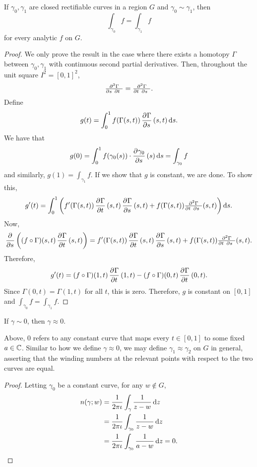 		\begin{ftheo}
			If $\gamma_0,\gamma_1$ are closed rectifiable curves in a region $G$ and $\gamma_0 \sim \gamma_1$, then
			\[ \int_{\gamma_0} f = \int_{\gamma_1} f \]
			for every analytic $f$ on $G$.
		\end{ftheo}
		\begin{proof}
			We only prove the result in the case where there exists a homotopy $\Gamma$ between $\gamma_0,\gamma_1$ with continuous second partial derivatives. Then, throughout the unit square $I^2 = [0,1]^2$,
			\[ \md{\Gamma}{2}{s}{\phantom{1}}{t}{\phantom{1}} = \md{\Gamma}{2}{t}{\phantom{1}}{s}{\phantom{1}}. \]
			Define
			\[ g(t) = \int_0^1 f(\Gamma(s,t)) \dpd{\Gamma}{s}(s,t) \dif s. \]
			We have that
			\[ g(0) = \int_0^1 f(\gamma_0(s)) \cdot \dpd{\gamma_0}{s}(s) \dif s = \int_{\gamma_0} f \]
			and similarly, $g(1) = \int_{\gamma_1} f$. If we show that $g$ is constant, we are done. To show this,
			\[ g'(t) = \int_0^1 \left( f'(\Gamma(s,t)) \dpd{\Gamma}{t}(s,t) \dpd{\Gamma}{s}(s,t) + f(\Gamma(s,t)) \md{\Gamma}{2}{t}{\phantom{1}}{s}{\phantom{1}}(s,t) \right) \dif s. \]
			Now,
			\[ \dpd{}{s} \left( (f \circ \Gamma)(s,t) \dpd{\Gamma}{t}(s,t) \right) = f'(\Gamma(s,t)) \dpd{\Gamma}{t}(s,t) \dpd{\Gamma}{s}(s,t) + f(\Gamma(s,t)) \md{\Gamma}{2}{t}{\phantom{1}}{s}{\phantom{1}}(s,t). \]
			Therefore,
			\[ g'(t) = (f \circ \Gamma)(1,t) \dpd{\Gamma}{t}(1,t) - (f \circ \Gamma)(0,t) \dpd{\Gamma}{t}(0,t). \]
			Since $\Gamma(0,t) = \Gamma(1,t)$ for all $t$, this is zero. Therefore, $g$ is constant on $[0,1]$ and $\int_{\gamma_0} f = \int_{\gamma_1} f$.
		\end{proof}

		\begin{corollary}
			If $\gamma \sim 0$, then $\gamma \approx 0$.
		\end{corollary}
		Above, $0$ refers to any constant curve that maps every $t \in [0,1]$ to some fixed $a \in \mathbb{C}$. Similar to how we define $\gamma \approx 0$, we may define $\gamma_1 \approx \gamma_2$ on $G$ in general, asserting that the winding numbers at the relevant points with respect to the two curves are equal.
		\begin{proof}
			Letting $\gamma_0$ be a constant curve, for any $w \not \in G$,
			\begin{align*}
				n(\gamma;w) &= \frac{1}{2\pi\iota} \int_\gamma \frac{1}{z-w} \dif z \\
					&= \frac{1}{2\pi\iota} \int_{\gamma_0} \frac{1}{z-w} \dif z \\
					&= \frac{1}{2\pi\iota} \int_{\gamma_0} \frac{1}{a-w} \dif z = 0.
			\end{align*}
		\end{proof}

